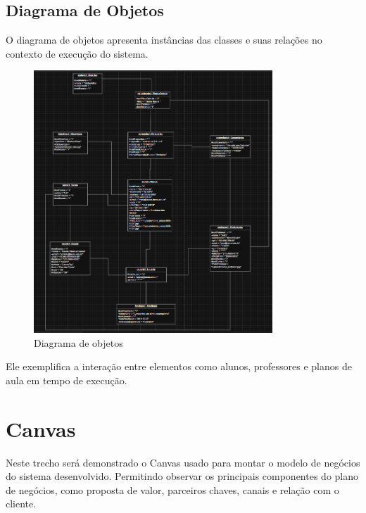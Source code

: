 \documentclass[
  a4paper,
  12pt,
  english,
  brazilian,
]{article}
\begin{document}
\subsection*{Diagrama de Objetos}

O diagrama de objetos apresenta instâncias das classes e suas relações no contexto de execução do sistema.

\begin{figure}[H]
\centering
\caption{Diagrama de objetos}%
\label{fig:diagrama-objetos}
\includegraphics[width=0.8\textwidth]{Logos/diagrama_objetos.png}
\end{figure}

Ele exemplifica a interação entre elementos como alunos, professores e planos de aula em tempo de execução.

\section*{Canvas}

Neste trecho será demonstrado o Canvas usado para montar o modelo de negócios do sistema desenvolvido. Permitindo observar os principais componentes do plano de negócios, como proposta de valor, parceiros chaves, canais e relação com o cliente.
\end{document}
